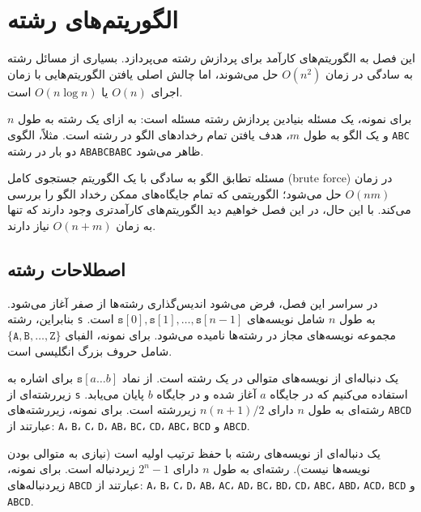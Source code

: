 \chapter{الگوریتم‌های رشته}

این فصل به الگوریتم‌های کارآمد برای پردازش رشته می‌پردازد.
بسیاری از مسائل رشته به سادگی در زمان $O(n^2)$ حل می‌شوند، اما چالش اصلی یافتن الگوریتم‌هایی با زمان اجرای $O(n)$ یا $O(n \log n)$ است.


برای نمونه، یک مسئله بنیادین پردازش رشته مسئله  است:
به ازای یک رشته به طول $n$ و یک الگو به طول $m$، هدف یافتن تمام رخدادهای الگو در رشته است.
مثلاً، الگوی \texttt{ABC} دو بار در رشته \texttt{ABABCBABC} ظاهر می‌شود.

مسئله تطابق الگو به سادگی با یک الگوریتم جستجوی کامل (brute force) در زمان $O(nm)$ حل می‌شود؛ الگوریتمی که تمام جایگاه‌های ممکن رخداد الگو را بررسی می‌کند.
با این حال، در این فصل خواهیم دید الگوریتم‌های کارآمدتری وجود دارند که تنها به زمان $O(n+m)$ نیاز دارند.


\section{اصطلاحات رشته}


در سراسر این فصل، فرض می‌شود اندیس‌گذاری رشته‌ها از صفر آغاز می‌شود.
بنابراین، رشته \texttt{s} به طول $n$ شامل نویسه‌های
$\texttt{s}[0],\texttt{s}[1],\ldots,\texttt{s}[n-1]$
است.
مجموعه نویسه‌های مجاز در رشته‌ها  نامیده می‌شود.
برای نمونه، الفبای
$\{\texttt{A},\texttt{B},\ldots,\texttt{Z}\}$
شامل حروف بزرگ انگلیسی است.


یک  دنباله‌ای از نویسه‌های متوالی در یک رشته است.
از نماد $\texttt{s}[a \ldots b]$ برای اشاره به زیررشته‌ای از \texttt{s} استفاده می‌کنیم که در جایگاه $a$ آغاز شده و در جایگاه $b$ پایان می‌یابد.
رشته‌ای به طول $n$ دارای $n(n+1)/2$ زیررشته است.
برای نمونه، زیررشته‌های
\texttt{ABCD} عبارتند از:
\texttt{A}، \texttt{B}، \texttt{C}، \texttt{D}،
\texttt{AB}، \texttt{BC}، \texttt{CD}،
\texttt{ABC}، \texttt{BCD} و \texttt{ABCD}.


یک  دنباله‌ای از نویسه‌های رشته با حفظ ترتیب اولیه است (نیازی به متوالی بودن نویسه‌ها نیست).
رشته‌ای به طول $n$ دارای $2^n-1$ زیردنباله است.
برای نمونه، زیردنباله‌های
\texttt{ABCD} عبارتند از:
\texttt{A}، \texttt{B}، \texttt{C}، \texttt{D}،
\texttt{AB}، \texttt{AC}، \texttt{AD}،
\texttt{BC}، \texttt{BD}، \texttt{CD}،
\texttt{ABC}، \texttt{ABD}، \texttt{ACD}،
\texttt{BCD} و \texttt{ABCD}.

